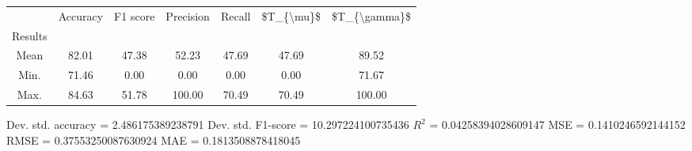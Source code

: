 \begin{tabular}{|c|c|c|c|c|c|c|}
\toprule
{} &  Accuracy &  F1 score &  Precision &  Recall &  \$T\_\{\textbackslash mu\}\$ &  \$T\_\{\textbackslash gamma\}\$ \\
Results &           &           &            &         &            &               \\
\hline
Mean    &     82.01 &     47.38 &      52.23 &   47.69 &      47.69 &         89.52 \\
Min.    &     71.46 &      0.00 &       0.00 &    0.00 &       0.00 &         71.67 \\
Max.    &     84.63 &     51.78 &     100.00 &   70.49 &      70.49 &        100.00 \\
\bottomrule
\end{tabular}

 Dev. std. accuracy = 2.486175389238791
 Dev. std. F1-score = 10.297224100735436
 $R^2$ = 0.04258394028609147
 MSE = 0.1410246592144152
 RMSE = 0.37553250087630924
 MAE = 0.1813508878418045